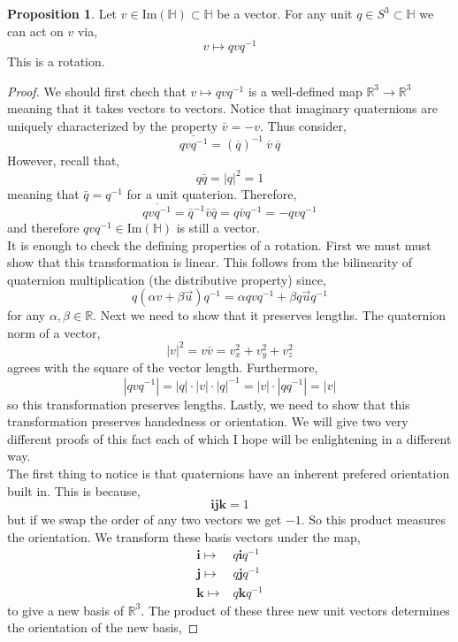 \documentclass[12pt]{extarticle}
\newcommand{\R}{\mathbb{R}}
\renewcommand{\Im}[1]{\mathrm{Im}(#1)}
\theoremstyle{definition}
\newtheorem{proposition}[theorem]{Proposition}
\renewcommand{\bf}[1]{\mathbf{#1}}
\renewcommand{\H}{\mathbb{H}}
\begin{document}
\begin{proposition}
Let $v \in \Im{\H} \subset \H$ be a vector. For any unit $q \in S^3 \subset \H$ we can act on $v$ via,
\[ v \mapsto q v q^{-1} \]
This is a rotation. 
\end{proposition}

\begin{proof}
We should first chech that $v \mapsto q v q^{-1}$ is a well-defined map $\R^3 \to \R^3$ meaning that it takes vectors to vectors. Notice that imaginary quaternions are uniquely characterized by the property $\bar{v} = - v$. Thus consider,
\[ \overline{q v q^{-1}} = (\overline{q})^{-1} \: \overline{v} \: \overline{q} \]
However, recall that,
\[ q \bar{q} = |q|^2 = 1 \]
meaning that $\bar{q} = q^{-1}$ for a unit quaterion. Therefore,
\[ \overline{q v q^{-1}} = \bar{q}^{-1} \bar{v} \bar{q} = q \bar{v} q^{-1} = - q v q^{-1} \]
and therefore $q v q^{-1} \in \Im{\H}$ is still a vector.
\bigskip\\
It is enough to check the defining properties of a rotation. First we must must show that this transformation is linear. This follows from the bilinearity of quaternion multiplication (the distributive property) since,
\[ q(\alpha v + \beta \vec{u}) q^{-1} = \alpha q v q^{-1} + \beta q \vec{u} q^{-1} \]
for any $\alpha, \beta \in \R$. 
Next we need to show that it preserves lengths. The quaternion norm of a vector,
\[ |v|^2 = v \bar{v} = v_x^2 + v_y^2 + v_z^2 \]
agrees with the square of the vector length. Furthermore,
\[ |q v q^{-1}| = |q| \cdot |v| \cdot |q|^{-1} = |v| \cdot |q q^{-1}| = |v| \]
so this transformation preserves lengths. Lastly, we need to show that this transformation preserves handedness or orientation. We will give two very different proofs of this fact each of which I hope will be enlightening in a different way.
\bigskip\\
The first thing to notice is that quaternions have an inherent prefered orientation built in. This is because,
\[ \bf{i} \bf{j} \bf{k} = 1 \]
but if we swap the order of any two vectors we get $-1$. So this product measures the orientation. We transform these basis vectors under the map,
\begin{align*}
\bf{i} \mapsto & q \bf{i} q^{-1}
\\
\bf{j} \mapsto & q \bf{j} q^{-1}
\\
\bf{k} \mapsto & q \bf{k} q^{-1}
\end{align*}
to give a new basis of $\R^3$. The product of these three new unit vectors determines the orientation of the new basis,

\end{proof}
\end{document}
